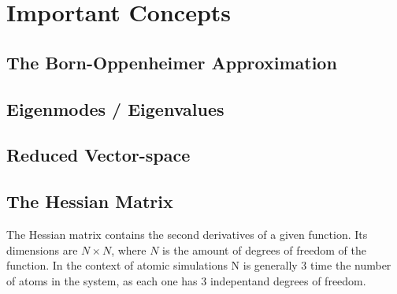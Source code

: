 \section{Important Concepts}
\subsection{The Born-Oppenheimer Approximation}
\placeholder

\subsection{Eigenmodes / Eigenvalues}
\placeholder

\subsection{Reduced Vector-space}
\placeholder

\subsection{The Hessian Matrix}
The Hessian matrix contains the second derivatives of a given function.
Its dimensions are $N\times N$, where $N$ is the amount of degrees of freedom of the function.
In the context of atomic simulations N is generally 3 time the number of atoms in the system, as each one has 3 indepentand degrees of freedom.
\incomplete
